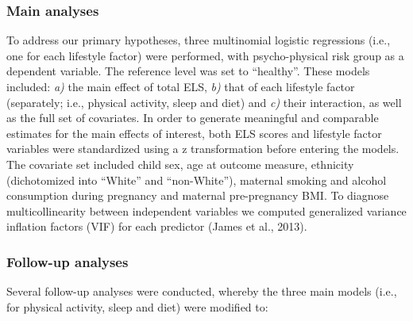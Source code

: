 \documentclass[
  letterpaper,
  DIV=11,
  numbers=noendperiod]{scrreport}
\begin{document}
\subsubsection{Main analyses}\label{main-analyses}

To address our primary hypotheses, three multinomial logistic
regressions (i.e., one for each lifestyle factor) were performed, with
psycho-physical risk group as a dependent variable. The reference level
was set to ``healthy''. These models included: \emph{a)} the main effect
of total ELS, \emph{b)} that of each lifestyle factor (separately; i.e.,
physical activity, sleep and diet) and \emph{c)} their interaction, as
well as the full set of covariates. In order to generate meaningful and
comparable estimates for the main effects of interest, both ELS scores
and lifestyle factor variables were standardized using a z
transformation before entering the models. The covariate set included
child sex, age at outcome measure, ethnicity (dichotomized into
``White'' and ``non-White''), maternal smoking and alcohol consumption
during pregnancy and maternal pre-pregnancy BMI. To diagnose
multicollinearity between independent variables we computed generalized
variance inflation factors (VIF) for each predictor (James et al.,
2013).

\subsubsection{Follow-up analyses}\label{follow-up-analyses-1}

Several follow-up analyses were conducted, whereby the three main models
(i.e., for physical activity, sleep and diet) were modified to:
\end{document}
